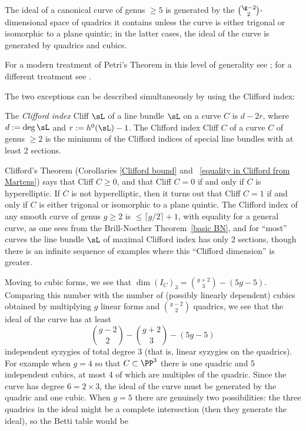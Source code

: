 \begin{theorem} [Petri]
The ideal of a canonical curve of genus $\geq 5$ is generated by the $\g-2\choose 2$-dimensional space of quadrics it contains unless the curve is either trigonal or isomorphic to a plane quintic; in the latter cases, the ideal of the curve is generated by quadrics and cubics.
\end{theorem}

For a modern treatment of Petri's Theorem in this level of generality see \cite{Schreyer}; for a different treatment see \cite{Arbarello-Sernesi}.

The two exceptions can be described simultaneously by using the Clifford index:

\begin{definition}
 The \emph{Clifford index} Cliff $\sL$ of a line bundle $\sL$ on a curve $C$ is $d-2r$, where $d := \deg \sL$ and $r :=  h^0(\sL)-1$. The Clifford index Cliff $C$ of
 a curve $C$ of genus $\geq 2$ is the minimum of the Clifford indices of special line bundles with at least 2 sections.
\end{definition}

Clifford's Theorem (Corollaries \ref{Clifford bound} and ~\ref{equality in Clifford from Martens}) says that Cliff $C \geq 0$, and that Cliff $C = 0$ if and only if $C$ is hyperelliptic. If $C$ is not hyperelliptic, then it turns out that Cliff $C=1$ if and only if $C$ is either trigonal or isomorphic to a plane quintic. The Clifford index of any smooth curve of genus $g\geq 2$ is $\leq \lceil g/2\rceil+1$, with equality for a general curve, as one sees from the Brill-Noether Theorem~\ref{basic BN}, and for ``most'' curves the line bundle $\sL$ of maximal Clifford index has only 2 sections, though there is an infinite sequence of examples where this
``Clifford dimension'' is greater.

Moving to cubic forms, we see that $\dim ({I_C})_3 = {g+2\choose 3}-(5g-5)$. Comparing this number with the number of (possibly linearly dependent)
cubics obtained by multiplying $g$ linear forms and ${g-2\choose 2}$ quadrics, we see that the ideal of the curve has at least
$$
{g-2\choose 2} - {g+2\choose 3}-(5g-5) 
$$
independent syzygies of total degree 3 (that is, linear syzygies on the quadrics). For example when $g=4$ so that $C\subset \PP^3$ there is one quadric and 5 independent
cubics, at most 4 of which are multiples of the quadric. Since the curve has degree $6 = 2\times 3$, the ideal of the curve must be generated by
the quadric and one cubic. When $g=5$ there are genuinely two possibilities: the three quadrics in the ideal might be a complete intersection
(then they generate the ideal), so the Betti table would be


